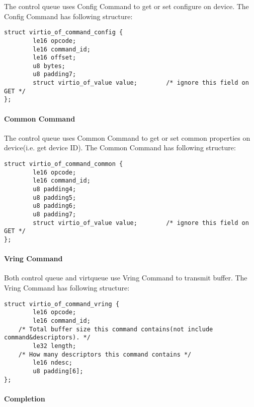 The control queue uses Config Command to get or set configure on device. The Config Command has following structure:

\begin{lstlisting}
struct virtio_of_command_config {
        le16 opcode;
        le16 command_id;
        le16 offset;
        u8 bytes;
        u8 padding7;
        struct virtio_of_value value;        /* ignore this field on GET */
};
\end{lstlisting}

\paragraph{Common Command}\label{sec:Virtio Transport Options / Virtio Over Fabrics / Transmition Protocol / Commands Definition / Common Command}

The control queue uses Common Command to get or set common properties on device(i.e. get device ID). The Common Command has following structure:

\begin{lstlisting}
struct virtio_of_command_common {
        le16 opcode;
        le16 command_id;
        u8 padding4;
        u8 padding5;
        u8 padding6;
        u8 padding7;
        struct virtio_of_value value;        /* ignore this field on GET */
};
\end{lstlisting}


\paragraph{Vring Command}\label{sec:Virtio Transport Options / Virtio Over Fabrics / Transmition Protocol / Commands Definition / Vring Command}

Both control queue and virtqueue use Vring Command to transmit buffer. The Vring Command has following structure:

\begin{lstlisting}
struct virtio_of_command_vring {
        le16 opcode;
        le16 command_id;
	/* Total buffer size this command contains(not include command&descriptors). */
        le32 length;
	/* How many descriptors this command contains */
        le16 ndesc;
        u8 padding[6];
};
\end{lstlisting}

\paragraph{Completion}\label{sec:Virtio Transport Options / Virtio Over Fabrics / Transmition Protocol / Commands Definition / Completion}

